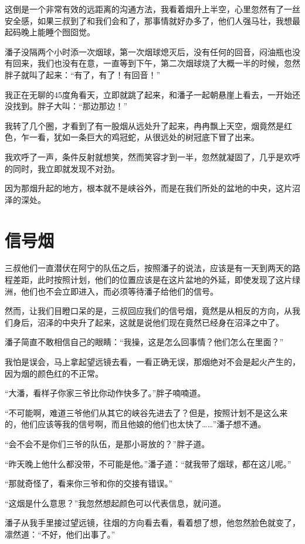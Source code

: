 这倒是一个非常有效的远距离的沟通方法，我看着烟升上半空，心里忽然有了一丝安全感，如果三叔到了和我们会和了，那事情就好办多了，他们人强马壮，我想最起码晚上能睡个囫囵觉。

潘子没隔两个小时添一次烟球，第一次烟球熄灭后，没有任何的回音，闷油瓶也没有回来，我们也没有在意，一直等到下午，第二次烟球烧了大概一半的时候，忽然胖子就叫了起来：“有了，有了！有回音！”

我正在无聊的45度角看天，立即就跳了起来，和潘子一起朝悬崖上看去，一开始还没找到。胖子大叫：“那边那边！”

我转了几个圈，才看到了有一股烟从远处升了起来，冉冉飘上天空，烟竟然是红色，乍一看，犹如一条巨大的鸡冠蛇，从很远处的树冠底下冒了出来。

我欢呼了一声，条件反射就想笑，然而笑容才到一半，忽然就凝固了，几乎是欢呼的同时，我立即就发现不对劲。

因为那烟升起的地方，根本就不是峡谷外，而是在我们所处的盆地的中央，这片沼泽的深处。

\chapter{信号烟}

三叔他们一直潜伏在阿宁的队伍之后，按照潘子的说法，应该是有一天到两天的路程差距，此时按照计划，他们的位置应该是在这片盆地的外延，即使发现了这片绿洲，他们也不会立即进入，而必须等待潘子给他们的信号。

然而，让我们目瞪口呆的是，三叔回应我们的信号烟，竟然是从相反的方向，从我们身后，沼泽的中央升了起来，这就是说他们现在竟然已经身在沼泽之中了。

潘子简直不敢相信自己的眼睛：“我操，这是怎么回事情？他们怎么在里面？”

我怕是误会，马上拿起望远镜去看，一看正确无误，那烟绝对不会是起火产生的，因为烟的颜色红的不正常。

“大潘，看样子你家三爷比你动作快多了。”胖子喃喃道。

“不可能啊，难道三爷他们从其它的峡谷先进去了？但是，按照计划不是这么来的，他们应该等我的信号啊，而且他娘的他们也太快了……”潘子想不通。

“会不会不是你们三爷的队伍，是那小哥放的？”胖子道。

“昨天晚上他什么都没带，不可能是他。”潘子道：“就我带了烟球，都在这儿呢。”

“那就奇怪了，看来你三爷和你的交接有错误。”

“这烟是什么意思？”我忽然想起颜色可以代表信息，就问道。

潘子从我手里接过望远镜，往烟的方向看去看，看着想了想，他忽然脸色就变了，凛然道：“不好，他们出事了。”

